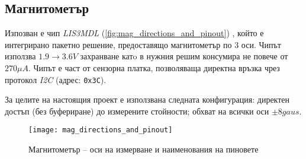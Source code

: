 \subsection{Магнитометър}


Изпозван е чип \textit{LIS3MDL} (\autoref{fig:mag_directions_and_pinout}) \cite{magnetometerrefman},
който е интегрирано пакетно решение, 
предоставящо магнитометър по 3 оси.
Чипът използва \(1.9 \to 3.6V\) захранване катo в нужния решим  консумира  не повече от \(270\mu A\).
Чипът е част от сензорна платка, позволяваща директна връзка чрез протокол \textit{I2C} (адрес: \texttt{0x3C}).

За целите на настоящия проект е използвана следната конфигурация:
директен достъп (без буфериране) до измерените стойности;
обхват на всички оси \(\pm 8gaus\).


\begin{figure}[htpb!]
    \centering
    \texttt{[image: mag\_directions\_and\_pinout]}
    \caption{Магнитометър -- оси на измерване и наименования на пиновете}
    \label{fig:mag_directions_and_pinout}
\end{figure}

\FloatBarrier
